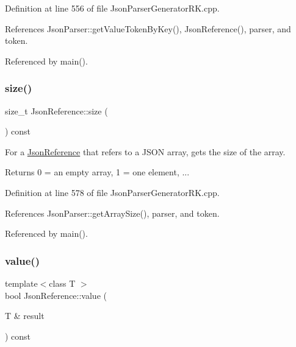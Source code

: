Definition at line 556 of file Json\+Parser\+Generator\+R\+K.\+cpp.



References Json\+Parser\+::get\+Value\+Token\+By\+Key(), Json\+Reference(), parser, and token.



Referenced by main().

\mbox{\label{class_json_reference_a9a196b64764b2943c425cee334f0b999}} 
\subsubsection{\texorpdfstring{size()}{size()}}
{\footnotesize\ttfamily size\+\_\+t Json\+Reference\+::size (\begin{DoxyParamCaption}{ }\end{DoxyParamCaption}) const}



For a \hyperlink{class_json_reference}{Json\+Reference} that refers to a J\+S\+ON array, gets the size of the array. 

\begin{DoxyReturn}{Returns}
0 = an empty array, 1 = one element, ... 
\end{DoxyReturn}


Definition at line 578 of file Json\+Parser\+Generator\+R\+K.\+cpp.



References Json\+Parser\+::get\+Array\+Size(), parser, and token.



Referenced by main().

\mbox{\label{class_json_reference_a9eb0bbb4ed98e7ebceeb41c757e0f15b}} 
\subsubsection{\texorpdfstring{value()}{value()}}
{\footnotesize\ttfamily template$<$class T $>$ \\
bool Json\+Reference\+::value (\begin{DoxyParamCaption}\item[{T \&}]{result }\end{DoxyParamCaption}) const\hspace{0.3cm}{\ttfamily [inline]}}



